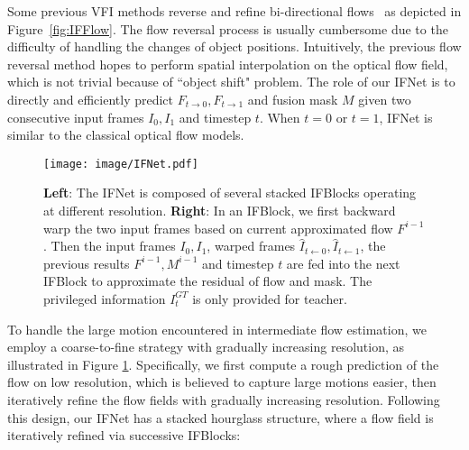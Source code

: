 \documentclass[final]{cvpr}
\begin{document}
Some previous VFI methods reverse and refine bi-directional flows~\cite{jiang2018super, xu2019quadratic, bao2019depth, liu2020enhanced} as depicted in Figure~\ref{fig:IFFlow}. The flow reversal process is usually cumbersome due to the difficulty of handling the changes of object positions. Intuitively, the previous flow reversal method hopes to perform spatial interpolation on the optical flow field, which is not trivial because of ``object shift" problem. The role of our IFNet is to directly and efficiently predict $F_{t\rightarrow 0}, F_{t\rightarrow 1}$ and fusion mask $M$ given two consecutive input frames $I_0, I_1$ and timestep $t$. When $t=0$ or $t=1$, IFNet is similar to the classical optical flow models.

\begin{figure}[t]
	\centering
	\texttt{[image: image/IFNet.pdf]}
	\caption{\textbf{Left}: The IFNet is composed of several stacked IFBlocks operating at different resolution. \textbf{Right}: In an IFBlock, we first backward warp the two input frames based on current approximated flow $F^{i-1}$. Then the input frames $I_0, I_1$, warped frames $\widehat{I}_{t\leftarrow 0}, \widehat{I}_{t\leftarrow 1}$, the previous results $F^{i-1}, M^{i-1}$ and timestep $t$ are fed into the next IFBlock to approximate the residual of flow and mask. The privileged information $I_t^{GT}$ is only provided for teacher. }\label{fig:IFNet}
\end{figure}


To handle the large motion encountered in intermediate flow estimation, we employ a coarse-to-fine strategy with gradually increasing resolution, as illustrated in Figure \ref{fig:IFNet}. Specifically, we first compute a rough prediction of the flow on low resolution, which is believed to capture large motions easier, then iteratively refine the flow fields with gradually increasing resolution. Following this design, our IFNet has a stacked hourglass structure, where a flow field is iteratively refined via successive IFBlocks:
\end{document}

